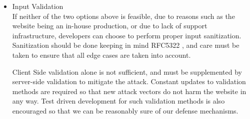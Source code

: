 \begin{itemize}
	\item Input Validation\\
	If neither of the two options above is feasible, due to reasons such as the website being an in-house production, or due to lack of support infrastructure, developers can choose to perform proper input sanitization. Sanitization should be done keeping in mind RFC5322 \cite{rfc5322}, and care must be taken to ensure that all edge cases are taken into account.
	
	Client Side validation alone is not sufficient, and must be supplemented by server-side validation to mitigate the attack. Constant updates to validation methods are required so that new attack vectors do not harm the website in any way.
	Test driven development for such validation methods is also encouraged so that we can be reasonably sure of our defense mechanisms.
\end{itemize}

